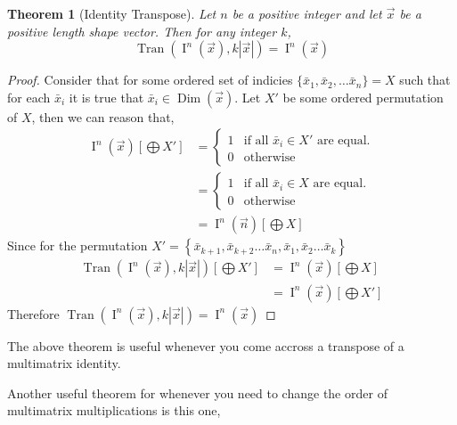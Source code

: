 \documentclass[12pt]{book}
\theoremstyle{plain}
\newtheorem{theorem}{Theorem}[chapter]
\theoremstyle{definition}
\theoremstyle{ppart}
\theoremstyle{case}
\theoremstyle{solution}
\DeclareMathOperator{\Dim}{Dim}
\DeclareMathOperator{\Ident}{I}
\DeclareMathOperator{\Tran}{Tran}
\begin{document}
\begin{theorem}[Identity Transpose]
Let $n$ be a positive integer and let $\vec{x}$ be a positive length
shape vector. Then for any integer $k$,
\[ \Tran(\Ident^n(\vec{x}), k|\vec{x}|) = \Ident^n(\vec{x}) \]
\end{theorem}
\begin{proof}
Consider that for some ordered set of indicies
$\{\bar{x}_1, \bar{x}_2, \ldots \bar{x}_n\} = X$ such that for each
$\bar{x}_i$ it is true that $\bar{x}_i \in \Dim(\vec{x})$.
Let $X'$ be some ordered permutation of $X$, then we can reason that,
\begin{align*}
 \Ident^n(\vec{x})\left[\bigoplus X'\right]
 &= 
	\left\{
  \begin{array}{ll}
    1 & \mbox{if all } \bar{x}_i \in X' \mbox{ are equal.}\\
    0 & \mbox{otherwise}
  \end{array}
	\right.\\
 &= 
	\left\{
  \begin{array}{ll}
    1 & \mbox{if all } \bar{x}_i \in X \mbox{ are equal.}\\
    0 & \mbox{otherwise}
  \end{array}
	\right.\\
 &=\Ident^n(\vec{n})\left[\bigoplus X\right]
\end{align*}
Since for the permutation
$X' = \left\{\bar{x}_{k+1}, \bar{x}_{k+2} \ldots \bar{x}_{n},
\bar{x}_1, \bar{x}_2 \ldots \bar{x}_k\right\}$
\begin{align*}
  \Tran(\Ident^n(\vec{x}), k|\vec{x}|)\left[\bigoplus X'\right]
	&=
  \Ident^n(\vec{x})\left[\bigoplus X\right]\\
	&=
  \Ident^n(\vec{x})\left[\bigoplus X'\right]
\end{align*}
Therefore
$\Tran(\Ident^n(\vec{x}), k|\vec{x}|) = \Ident^n(\vec{x})$
\end{proof}

The above theorem is useful whenever you come accross a transpose of a
multimatrix identity.

Another useful theorem for whenever you need to change the order of
multimatrix multiplications is this one,
\end{document}
